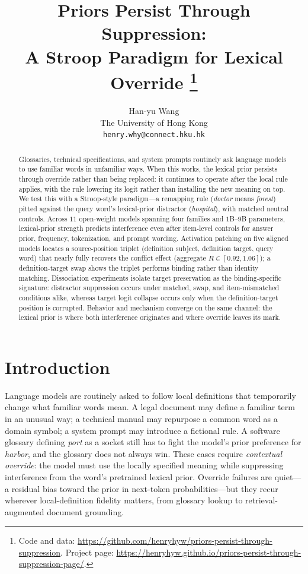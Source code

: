 \documentclass[11pt]{article}
\title{Priors Persist Through Suppression:\\A Stroop Paradigm for Lexical Override
\thanks{Code and data: \url{https://github.com/henryhyw/priors-persist-through-suppression}.
Project page: \url{https://henryhyw.github.io/priors-persist-through-suppression-page/}.}}
\author{Han-yu Wang \\
  The University of Hong Kong \\
  \texttt{henry.why@connect.hku.hk}}
\begin{document}
\maketitle

\begin{abstract}
Glossaries, technical specifications, and system prompts routinely ask language models to use
familiar words in unfamiliar ways. When this works, the lexical prior persists through
override rather than being replaced: it continues to operate after the local rule applies,
with the rule lowering its logit rather than installing the new meaning on top. We test this
with a Stroop-style paradigm---a remapping rule (\textit{doctor} means \textit{forest}) pitted
against the query word's lexical-prior distractor (\textit{hospital}), with matched neutral
controls. Across $11$ open-weight models spanning four families and $1$B--$9$B parameters,
lexical-prior strength predicts interference even after item-level controls for answer prior,
frequency, tokenization, and prompt wording. Activation patching on five aligned models locates a source-position triplet (definition
subject, definition target, query word) that nearly fully recovers the conflict effect
(aggregate $R \in [0.92, 1.06]$); a definition-target swap shows the triplet performs binding
rather than identity matching. Dissociation experiments isolate target preservation as the
binding-specific signature: distractor suppression occurs under matched, swap, and
item-mismatched conditions alike, whereas target logit collapse occurs only when the
definition-target position is corrupted. Behavior and mechanism converge on the same channel:
the lexical prior is where both interference originates and where override leaves its mark.
\end{abstract}


\section{Introduction}
\label{sec:intro}

Language models are routinely asked to follow local definitions that temporarily change
what familiar words mean. A legal document may define a familiar term in an unusual way; a
technical manual may repurpose a common word as a domain symbol; a system prompt may introduce
a fictional rule. A software glossary defining \emph{port} as a socket still has to fight the
model's prior preference for \emph{harbor}, and the glossary does not always win. These cases require \emph{contextual override}: the model must use the
locally specified meaning while suppressing interference from the word's pretrained lexical
prior. Override failures are quiet---a residual bias toward the prior in next-token
probabilities---but they recur wherever local-definition fidelity matters, from glossary
lookup to retrieval-augmented document grounding.
\end{document}
